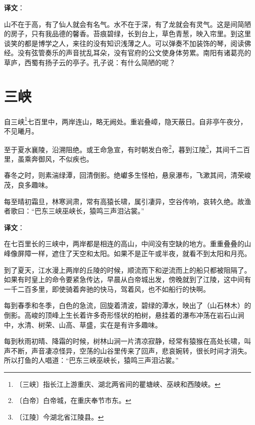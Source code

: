 \documentclass[12pt,UTF-8,openany]{ctexbook}
\begin{document}
\newpage

\textbf{译文}：

\vspace{1em}

\begin{normalsize}
    
    山不在于高，有了仙人就会有名气。水不在于深，有了龙就会有灵气。这是间简陋的房子，只有我品德的馨香。苔痕碧绿，长到台上，草色青葱，映入帘里。到这里谈笑的都是博学之人，来往的没有知识浅薄之人。可以弹奏不加装饰的琴，阅读佛经。没有弦管奏乐的声音扰乱耳朵，没有官府的公文使身体劳累。南阳有诸葛亮的草庐，西蜀有扬子云的亭子。孔子说：有什么简陋的呢？
    
\end{normalsize}



\chapter{三峡}

\begin{normalsize}
    
    自三峡\footnote{〔三峡〕指长江上游重庆、湖北两省间的瞿塘峡、巫峡和西陵峡。}七百里中，两岸连山，略无阙处。重岩叠嶂，隐天蔽日。自非亭午夜分，不见曦月。
    
    至于夏水襄陵，沿溯阻绝。或王命急宣，有时朝发白帝\footnote{〔白帝〕白帝城，在重庆奉节市东。}，暮到江陵\footnote{〔江陵〕今湖北省江陵县。}，其间千二百里，虽乘奔御风，不似疾也。
    
    春冬之时，则素湍绿潭，回清倒影。绝巘多生怪柏，悬泉瀑布，飞漱其间，清荣峻茂，良多趣味。
    
    每至晴初霜旦，林寒涧肃，常有高猿长啸，属引凄异，空谷传响，哀转久绝。故渔者歌曰：“巴东三峡巫峡长，猿鸣三声泪沾裳。”
\end{normalsize}


\newpage

\textbf{译文}：

\vspace{1em}

\begin{normalsize}
    
    在七百里长的三峡中，两岸都是相连的高山，中间没有空缺的地方。重重叠叠的山峰像屏障一样，遮住了天空和太阳。如果不是正午或半夜，就看不到太阳和月亮。
    
    到了夏天，江水漫上两岸的丘陵的时候，顺流而下和逆流而上的船只都被阻隔了。 如果有时皇上的命令要紧急传达，早晨从白帝城出发，傍晚就到了江陵，这中间有一千二百多里，即使骑着奔驰的快马，驾着风，也不如船行的快啊。
    
    每到春季和冬季，白色的急流，回旋着清波，碧绿的潭水，映出了（山石林木）的倒影。高峻的顶峰上生长着许多奇形怪状的柏树，悬挂着的瀑布冲荡在岩石山涧中，水清、树荣、山高、草盛，实在是有许多趣味。
    
    每到秋雨初晴、降霜的时候，树林山涧一片清凉寂静，经常有猿猴在高处长啸，叫声不断，声音凄凉怪异，空荡的山谷里传来了回声，悲哀婉转，很长时间才消失。所以打鱼的人唱道：“巴东三峡巫峡长，猿鸣三声泪沾裳。”
    
\end{normalsize}
\end{document}

